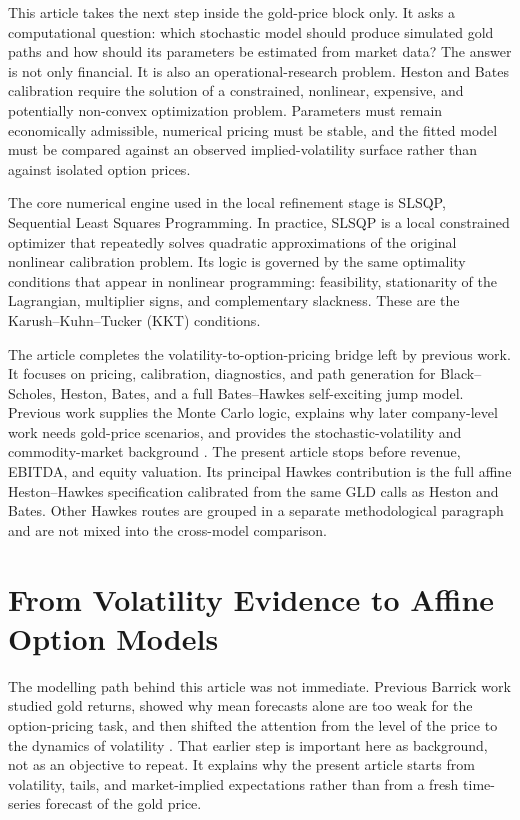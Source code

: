 \documentclass[a4paper,10pt,titlepage,oneside,openany]{book}
\theoremstyle{plain}
\theoremstyle{definition}
\theoremstyle{remark}
\begin{document}
This article takes the next step inside the gold-price block only. It asks a computational question: which stochastic model should produce simulated gold paths and how should its parameters be estimated from market data? The answer is not only financial. It is also an operational-research problem. Heston and Bates calibration require the solution of a constrained, nonlinear, expensive, and potentially non-convex optimization problem. Parameters must remain economically admissible, numerical pricing must be stable, and the fitted model must be compared against an observed implied-volatility surface rather than against isolated option prices.

The core numerical engine used in the local refinement stage is SLSQP, Sequential Least Squares Programming. In practice, SLSQP is a local constrained optimizer that repeatedly solves quadratic approximations of the original nonlinear calibration problem. Its logic is governed by the same optimality conditions that appear in nonlinear programming: feasibility, stationarity of the Lagrangian, multiplier signs, and complementary slackness. These are the Karush--Kuhn--Tucker (KKT) conditions.

\begin{tcolorbox}[title={Scope of this article}, colback=white, boxrule=0.4pt]
The article completes the volatility-to-option-pricing bridge left by previous work. It focuses on pricing, calibration, diagnostics, and path generation for Black--Scholes, Heston, Bates, and a full Bates--Hawkes self-exciting jump model. Previous work supplies the Monte Carlo logic, explains why later company-level work needs gold-price scenarios, and provides the stochastic-volatility and commodity-market background \cite{BarrickArticle3,BarrickArticle4,BarrickArticle5,BarrickArticle6,BarrickArticle7}. The present article stops before revenue, EBITDA, and equity valuation. Its principal Hawkes contribution is the full affine Heston--Hawkes specification calibrated from the same GLD calls as Heston and Bates. Other Hawkes routes are grouped in a separate methodological paragraph and are not mixed into the cross-model comparison.
\end{tcolorbox}

\section{From Volatility Evidence to Affine Option Models}

The modelling path behind this article was not immediate. Previous Barrick work studied gold returns, showed why mean forecasts alone are too weak for the option-pricing task, and then shifted the attention from the level of the price to the dynamics of volatility \cite{BarrickArticle6}. That earlier step is important here as background, not as an objective to repeat. It explains why the present article starts from volatility, tails, and market-implied expectations rather than from a fresh time-series forecast of the gold price.
\end{document}
